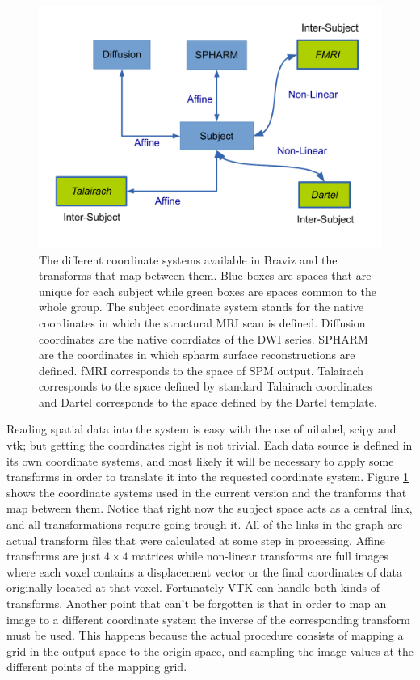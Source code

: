 \begin{figure}
\includegraphics[width=\textwidth]{figures/coordinate_systems}
\caption{\label{fig_coordinates} The different coordinate systems available in Braviz and the transforms that map between them. Blue boxes are spaces that are unique for each subject while green boxes are spaces common to the whole group. The subject coordinate system stands for the native coordinates in which the structural MRI scan is defined. Diffusion coordinates are the native coordiates of the DWI series. SPHARM are the coordinates in which spharm surface reconstructions are defined. fMRI corresponds to the space of SPM output. Talairach corresponds to the space defined by standard Talairach coordinates and Dartel corresponds to the space defined by the Dartel template. }
\end{figure}

Reading spatial data into the system is easy with the use of nibabel, scipy and vtk; but getting the coordinates right is not trivial. Each data source is defined in its own coordinate systems, and most likely it will be necessary to apply some transforms in order to translate it into the requested coordinate system. Figure \ref{fig_coordinates} shows the coordinate systems used in the current version and the tranforms that map between them. Notice that right now the subject space acts as a central link, and all transformations require going trough it. All of the links in the graph are actual transform files that were calculated at some step in processing. Affine transforms are just $4\times4$ matrices while non-linear transforms are full images where each voxel contains a displacement vector or the final coordinates of data originally located at that voxel. Fortunately VTK can handle both kinds of transforms. Another point that can't be forgotten is that in order to map an image to a different coordinate system the inverse of the corresponding transform must be used. This happens because the actual procedure consists of mapping a grid in the output space to the origin space, and sampling the image values at the different points of the mapping grid.

